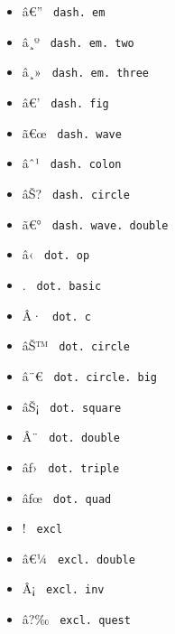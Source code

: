 \begin{itemize}
\item
  \label{symbol-dash.em}{{ â€'' } \texttt{\ dash.\ em\ }}
\item
  \label{symbol-dash.em.two}{{ â¸º }
  \texttt{\ dash.\ em.\ two\ }}
\item
  \label{symbol-dash.em.three}{{ â¸» }
  \texttt{\ dash.\ em.\ three\ }}
\item
  \label{symbol-dash.fig}{{ â€' }
  \texttt{\ dash.\ fig\ }}
\item
  \label{symbol-dash.wave}{{ ã€œ }
  \texttt{\ dash.\ wave\ }}
\item
  \label{symbol-dash.colon}{{ âˆ¹ }
  \texttt{\ dash.\ colon\ }}
\item
  \label{symbol-dash.circle}{{ âŠ? }
  \texttt{\ dash.\ circle\ }}
\item
  \label{symbol-dash.wave.double}{{ ã€° }
  \texttt{\ dash.\ wave.\ double\ }}
\item
  \label{symbol-dot.op}{{ â‹ } \texttt{\ dot.\ op\ }}
\item
  \label{symbol-dot.basic}{{ . }
  \texttt{\ dot.\ basic\ }}
\item
  \label{symbol-dot.c}{{ Â· } \texttt{\ dot.\ c\ }}
\item
  \label{symbol-dot.circle}{{ âŠ™ }
  \texttt{\ dot.\ circle\ }}
\item
  \label{symbol-dot.circle.big}{{ â¨€ }
  \texttt{\ dot.\ circle.\ big\ }}
\item
  \label{symbol-dot.square}{{ âŠ¡ }
  \texttt{\ dot.\ square\ }}
\item
  \label{symbol-dot.double}{{ Â¨ }
  \texttt{\ dot.\ double\ }}
\item
  \label{symbol-dot.triple}{{ âƒ› }
  \texttt{\ dot.\ triple\ }}
\item
  \label{symbol-dot.quad}{{ âƒœ }
  \texttt{\ dot.\ quad\ }}
\item
  \label{symbol-excl}{{ ! } \texttt{\ excl\ }}
\item
  \label{symbol-excl.double}{{ â€¼ }
  \texttt{\ excl.\ double\ }}
\item
  \label{symbol-excl.inv}{{ Â¡ } \texttt{\ excl.\ inv\ }}
\item
  \label{symbol-excl.quest}{{ â?‰ }
  \texttt{\ excl.\ quest\ }}

\end{itemize}

